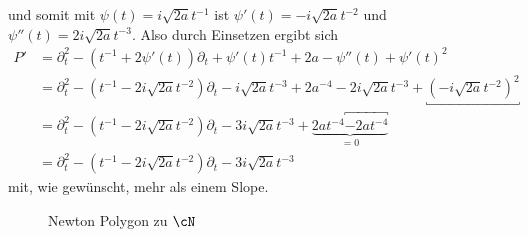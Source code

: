 und somit mit $\psi(t)=i\sqrt{2a}t^{-1}$ ist $\psi'(t)=-i\sqrt{2a}t^{-2}$ und
$\psi''(t)=2i\sqrt{2a}t^{-3}$. Also durch Einsetzen ergibt sich
\begin{align*}
P' &= \partial_t^2 - (t^{-1} + 2\psi'(t))\partial_t
    + \psi'(t)t^{-1} + 2a -\psi''(t)
    + \psi'(t)^2
\\&= \partial_t^2 - (t^{-1} - 2i\sqrt{2a}t^{-2})\partial_t - i\sqrt{2a}t^{-3}
    + 2a^{-4} - 2i\sqrt{2a}t^{-3} + \underbracket{(-i\sqrt{2a}t^{-2})^2}
\\&= \partial_t^2 - (t^{-1} - 2i\sqrt{2a}t^{-2})\partial_t - 3i\sqrt{2a}t^{-3}
  + \underset{=0}{\underbrace{ 2at^{-4} \overbracket{- 2at^{-4}}}}
\\&= \partial_t^2 - (t^{-1} - 2i\sqrt{2a}t^{-2})\partial_t - 3 i\sqrt{2a}t^{-3}
\end{align*}
mit, wie gewünscht, mehr als einem Slope.
\begin{figure}[H]
\begin{center}
\end{center}
\caption{Newton Polygon zu $\cN$}
\end{figure}
\begin{comment}
Alternative berechnung: mit Formel aus \cite[Seite 44]{DiplHedwig}
\[
P'(t,\partial_t)=\rho^*P(t,\partial_t-\frac{\partial \psi}{\partial t})
\]
es ist $\rho^*P(t,\partial_t)=t^4\partial_t^2-t^3\partial_t+2a$, und somit
\begin{align*}
P'(t,\partial_t) &= \rho^*P(t,\partial_t-\frac{\partial \psi}{\partial t})
\\&=\rho^*P(t,\partial_t-\frac{-i\sqrt{2a}}{t^2})
\\&= t^4\underbracket{(\partial_t+\frac{i\sqrt{2a}}{t^2})^2}
    \underbracket{- t^3(\partial_t+\frac{i\sqrt{2a}}{t^2})} + 2a
\\&= t^4 \overbracket{\underbracket{
      (\partial_t+i\sqrt{2a}t^{-2})(\partial_t+i\sqrt{2a}t^{-2})
    }} \overbracket{ - t^3\partial_t - i\sqrt{2a}t} + 2a
\\&= t^4 \overbracket{ (\partial_t^2 + i\sqrt{2a}t^{-2}\partial_t
      +\partial_ti\sqrt{2a}t^{-2} + \underbracket{(i\sqrt{2a}t^{-2})^2)}
    } - t^3\partial_t - i\sqrt{2a}t + 2a
\\&= t^4\partial_t^2 + i\sqrt{2a}t^{2}\partial_t
    + i\sqrt{2a}t^4\underbracket{\partial_tt^{-2}} \overbracket{-2at^{-4}}t^4
    - t^3\partial_t
    - i\sqrt{2a}t + 2a
\\&= t^4\partial_t^2 + i\sqrt{2a}t^{2}\partial_t
    + i\sqrt{2a}t^4\overbracket{(t^{-2}\partial_t-2t^{-3})} - t^3\partial_t
    - i\sqrt{2a}t
\\&= t^4\partial_t^2 + i\sqrt{2a}t^{2}\partial_t + i\sqrt{2a}t^2\partial_t
    - 2i\sqrt{2a}t - t^3\partial_t - i\sqrt{2a}t
\\&= t^4\partial_t^2 - (t^3-2i\sqrt{2a}t^{2})\partial_t - 3i\sqrt{2a}t
\end{align*}
\end{comment}

